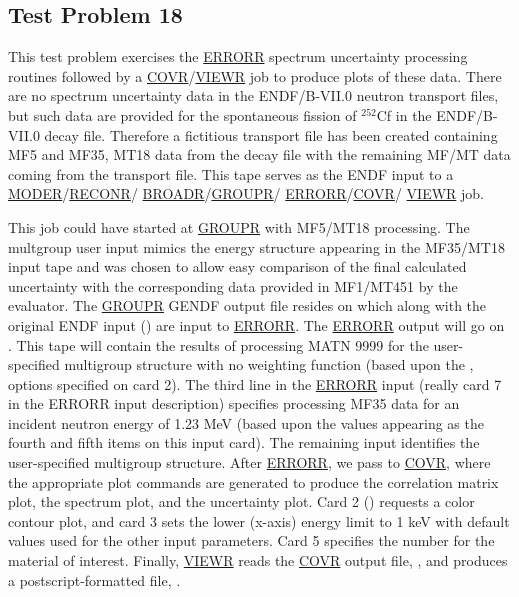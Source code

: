 \subsection{Test Problem 18}
\label{ssMandT_18}

This test problem exercises the \hyperlink{sERRORRhy}{ERRORR}
spectrum uncertainty processing routines followed by a
\hyperlink{sCOVRhy}{COVR}/\hyperlink{sVIEWRhy}{VIEWR} job to
produce plots of these data.  There are no spectrum uncertainty
data in the ENDF/B-VII.0 neutron transport files, but such data
are provided for the spontaneous fission of $^{252}$Cf in the
ENDF/B-VII.0 decay file.  Therefore a fictitious transport file has
been created containing MF5 and MF35, MT18 data from the
decay file with the remaining MF/MT data coming from the transport
file.  This tape serves as the ENDF input to a
\hyperlink{sMODERhy}{MODER}/\hyperlink{sRECONRhy}{RECONR}/
\hyperlink{sBROADRhy}{BROADR}/\hyperlink{sGROUPRhy}{GROUPR}/
\hyperlink{sERRORRhy}{ERRORR}/\hyperlink{sCOVRhy}{COVR}/
\hyperlink{sVIEWRhy}{VIEWR} job.

This job could have started at \hyperlink{sGROUPRhy}{GROUPR}
with MF5/MT18 processing.  The
multgroup user input mimics the energy structure appearing in the
MF35/MT18 input tape and was chosen to allow easy comparison of the
final calculated uncertainty with the corresponding data provided in
MF1/MT451 by the evaluator.  The \hyperlink{sGROUPRhy}{GROUPR}
GENDF output file resides on  which along with the
original ENDF input () are input to
\hyperlink{sERRORRhy}{ERRORR}.  The \hyperlink{sERRORRhy}{ERRORR}
output will go on .  This tape will contain the results
of processing MATN 9999 for the user-specified multigroup structure
with no weighting function (based upon the ,
 options specified on card 2).  The third line in the
\hyperlink{sERRORRhy}{ERRORR} input (really card 7 in the
ERRORR input description) specifies processing MF35 data for an
incident neutron energy of 1.23 MeV (based upon the 
values appearing as the fourth and fifth items on this input card).
The remaining input identifies the user-specified multigroup structure.
After \hyperlink{sERRORRhy}{ERRORR}, we pass  to
\hyperlink{sCOVRhy}{COVR}, where the appropriate
plot commands are generated to produce the correlation matrix plot,
the spectrum plot, and the uncertainty plot.  Card 2 ()
requests a color contour plot, and card 3 sets the lower (x-axis)
energy limit to 1 keV with default values used for the other input
parameters.  Card 5 specifies the  number for the material of
interest.  Finally, \hyperlink{sVIEWRhy}{VIEWR} reads the
\hyperlink{sCOVRhy}{COVR} output file, , and produces
a postscript-formatted file, .

